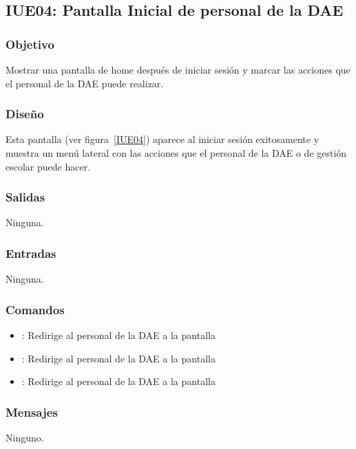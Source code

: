 \subsection{IUE04: Pantalla Inicial de personal de la DAE}

\subsubsection{Objetivo}
Mostrar una pantalla de home después de iniciar sesión y marcar las acciones que el personal de la DAE puede realizar.

\subsubsection{Diseño}
Esta pantalla  (ver figura~\ref{IUE04}) aparece al iniciar sesión exitosamente y muestra un menú lateral con las acciones que el personal de la DAE o de gestión escolar puede hacer. 


\subsubsection{Salidas}

Ninguna.

\subsubsection{Entradas}
Ninguna.

\subsubsection{Comandos}
\begin{itemize}
	\item {}: Redirige al personal de la DAE a la pantalla 
	\item {}: Redirige al personal de la DAE a la pantalla 
	\item {}: Redirige al personal de la DAE a la pantalla 	
\end{itemize}

\subsubsection{Mensajes}

\begin{Citemize}
	\item Ninguno.
\end{Citemize}

